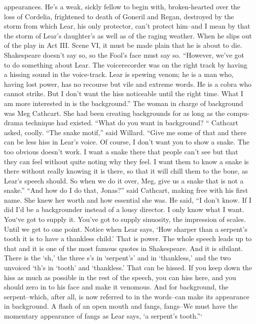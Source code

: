 \documentclass[a4paper,12pt]{article}
\begin{document}
appearances. He’s a weak, sickly fellow to begin with, broken-hearted over the loss of Cordelia, frightened
to death of Goneril and Regan, destroyed by the storm from which Lear, his only protector, can’t protect
him--and I mean by that the storm of Lear’s daughter’s as well as of the raging weather. When he slips out
of the play in Act III. Scene VI, it must be made plain that he is about to die. Shakespeare doesn’t say so, so
the Fool’s face must say so.
“However, we’ve got to do something about Lear. The voicerecorder was on the right track by
having a hissing sound in the voice-track. Lear is spewing venom; he is a man who, having lost power, has
no recourse but vile and extreme words. He is a cobra who cannot strike. But I don’t want the hiss
noticeable until the right time. What I am more interested in is the background.”
The woman in charge of background was Meg Cathcart. She had been creating backgrounds for as
long as the compu-drama technique had existed.
“What do you want in background? “ Cathcart asked, coolly.
“The snake motif,” said Willard. “Give me some of that and there can be less hiss in Lear’s voice.
Of course, I don’t want you to show a snake. The too obvious doesn’t work. I want a snake there that
people can’t see but that they can feel without quite noting why they feel. I want them to know a snake is
there without really knowing it is there, so that it will chill them to the bone, as Lear’s speech should. So
when we do it over, Meg, give us a snake that is not a snake.”
“And how do I do that, Jonas?” said Cathcart, making free with his first name. She knew her
worth and how essential she was.
He said, “I don’t know. If I did I’d be a backgrounder instead of a lousy director. I only know
what I want. You‘ve got to supply it. You’ve got to supply sinuosity, the impression of scales. Until we get
to one point. Notice when Lear says, ‘How sharper than a serpent’s tooth it is to have a thankless child.’
That is power. The whole speech leads up to that and it is one of the most famous quotes in Shakespeare.
And it is sibilant. There is the ‘sh,’ the three s’s in ‘serpent’s’ and in ‘thankless,’ and the two unvoiced ‘th’s
in ‘tooth’ and ‘thankless.’ That can be hissed. If you keep down the hiss as much as possible in the rest of
the speech, you can hiss here, and you should zero in to his face and make it venomous. And for
background, the serpent--which, after all, is now referred to in the words--can make its appearance in
background. A flash of an open mouth and fangs, fangs--We must have the momentary appearance of fangs
as Lear says, ‘a serpent’s tooth.”‘
\end{document}
